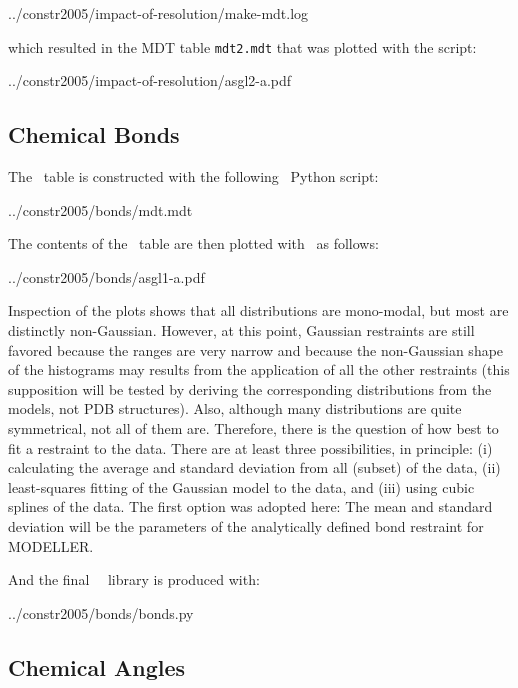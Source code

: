            {../constr2005/impact-of-resolution/make-mdt.log}

\noindent which resulted in the MDT table {\tt mdt2.mdt} that was plotted with
the script:

           {../constr2005/impact-of-resolution/asgl2-a.pdf}

\subsection{Chemical Bonds}

The \MDT\ table is constructed with the following \MDT\ Python script:

           {../constr2005/bonds/mdt.mdt}

The contents of the \MDT\ table are then plotted with \ASGL\ as follows:

           {../constr2005/bonds/asgl1-a.pdf}


Inspection of the plots shows that all distributions are mono-modal, but most are distinctly 
non-Gaussian. However, at this point, Gaussian restraints are still favored because the 
ranges are very narrow and because the non-Gaussian shape of the histograms
may results from the application of all the other restraints (this supposition will
be tested by deriving the corresponding distributions from the models, not PDB structures). Also, 
although many distributions are quite symmetrical, not all of them are. Therefore, there is the question
of how best to fit a restraint to the data. There are at least three possibilities, in principle: 
(i) calculating the average and standard deviation from all (subset) of the data, (ii) least-squares fitting of 
the Gaussian model to the data, and (iii) using cubic splines of the data. The first option was adopted here:
The mean and standard deviation will be the parameters of the analytically defined bond restraint for MODELLER.

And the final \MODELLER\ \MDT\ library is produced with:

           {../constr2005/bonds/bonds.py}


\subsection{Chemical Angles}


